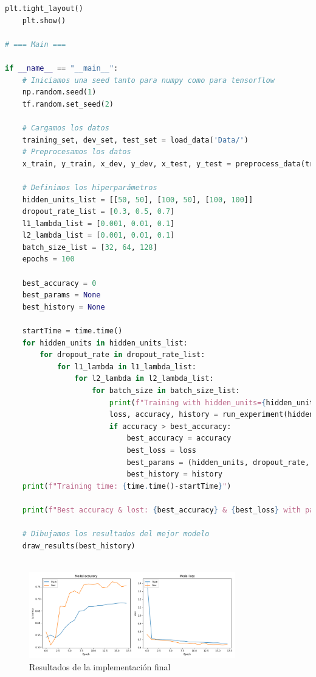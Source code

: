 \documentclass{report}
\begin{document}
\begin{lstlisting}[language=Python, caption=Implementación final del perceptron]
    plt.tight_layout()
    plt.show()

# === Main ===

if __name__ == "__main__":
    # Iniciamos una seed tanto para numpy como para tensorflow
    np.random.seed(1)
    tf.random.set_seed(2)
    
    # Cargamos los datos
    training_set, dev_set, test_set = load_data('Data/')
    # Preprocesamos los datos
    x_train, y_train, x_dev, y_dev, x_test, y_test = preprocess_data(training_set, dev_set, test_set)
    
    # Definimos los hiperparámetros
    hidden_units_list = [[50, 50], [100, 50], [100, 100]]
    dropout_rate_list = [0.3, 0.5, 0.7]
    l1_lambda_list = [0.001, 0.01, 0.1]
    l2_lambda_list = [0.001, 0.01, 0.1]
    batch_size_list = [32, 64, 128]
    epochs = 100

    best_accuracy = 0
    best_params = None
    best_history = None

    startTime = time.time()
    for hidden_units in hidden_units_list:
        for dropout_rate in dropout_rate_list:
            for l1_lambda in l1_lambda_list:
                for l2_lambda in l2_lambda_list:
                    for batch_size in batch_size_list:
                        print(f"Training with hidden_units={hidden_units}, dropout_rate={dropout_rate}, l1_lambda={l1_lambda}, l2_lambda={l2_lambda}, batch_size={batch_size}")
                        loss, accuracy, history = run_experiment(hidden_units, dropout_rate, l1_lambda, l2_lambda, epochs, batch_size)
                        if accuracy > best_accuracy:
                            best_accuracy = accuracy
                            best_loss = loss
                            best_params = (hidden_units, dropout_rate, l1_lambda, l2_lambda, batch_size)
                            best_history = history
    print(f"Training time: {time.time()-startTime}")

    print(f"Best accuracy & lost: {best_accuracy} & {best_loss} with parameters: hidden_units={best_params[0]}, dropout_rate={best_params[1]}, l1_lambda={best_params[2]} l2_lambda={best_params[3]}, batch_size={best_params[4]}")
    
    # Dibujamos los resultados del mejor modelo
    draw_results(best_history)
    
        \end{lstlisting}
        \begin{figure}[H]
          \centering
          \includegraphics[width=0.8\textwidth]{.img/perceptron2.png}
          \caption{Resultados de la implementación final}
        \end{figure}
        \clearpage
\end{document}
